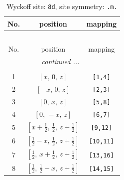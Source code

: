 \documentclass[fleqn,8pt]{jsarticle}
\begin{document}
\begin{longtable}{ccc}
\caption{Wyckoff site: {\tt 8d}, site symmetry: {\tt .m.}}
 \\
 \hline \hline
No. & position & mapping \\ \hline \endfirsthead

\multicolumn{2}{l}{\tablename\ \thetable{}} \\
 \hline \hline
No. & position & mapping \\ \hline \endhead

 \hline \hline
\multicolumn{2}{r}{\footnotesize\it continued ...} \\ \endfoot

 \hline \hline
\multicolumn{2}{r}{} \\ \endlastfoot

1 & $\left[ x,\, 0,\, z \right]$ & {\tt [1,4]} \\ \hline
2 & $\left[ - x,\, 0,\, z \right]$ & {\tt [2,3]} \\ \hline
3 & $\left[ 0,\, x,\, z \right]$ & {\tt [5,8]} \\ \hline
4 & $\left[ 0,\, - x,\, z \right]$ & {\tt [6,7]} \\ \hline
5 & $\left[ x + \frac{1}{2},\, \frac{1}{2},\, z + \frac{1}{2} \right]$ & {\tt [9,12]} \\ \hline
6 & $\left[ \frac{1}{2} - x,\, \frac{1}{2},\, z + \frac{1}{2} \right]$ & {\tt [10,11]} \\ \hline
7 & $\left[ \frac{1}{2},\, x + \frac{1}{2},\, z + \frac{1}{2} \right]$ & {\tt [13,16]} \\ \hline
8 & $\left[ \frac{1}{2},\, \frac{1}{2} - x,\, z + \frac{1}{2} \right]$ & {\tt [14,15]} \\
\end{longtable}
\renewcommand{\arraystretch}{1.2}
\end{document}
